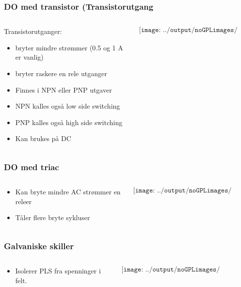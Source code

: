 \documentclass[aspectratio=169,xcolor=dvipsnames]{beamer}
\begin{document}
\begin{frame}
	\frametitle{DO med transistor (Transistorutgang}
	\begin{columns}
		\begin{column}{0.5\textwidth}
			Transistorutganger:
			\begin{itemize}
				\item bryter mindre strømmer (0.5 og 1 A er vanlig)
				\item bryter raskere en rele utganger
				\item Finnes i NPN eller PNP utgaver
				\item NPN kalles også low side switching
				\item PNP kalles også high side switching
				\item Kan brukes på DC
			\end{itemize}

			
		\end{column}

		\begin{column}{0.5\textwidth}
	$$\texttt{[image: ../output/noGPLimages/pls04.png]}$$
		\end{column}
	\end{columns}
\end{frame}

\begin{frame}
	\frametitle{DO med triac}
	\begin{columns}
		\begin{column}{0.5\textwidth}
			\begin{itemize}
				\item Kan bryte mindre AC strømmer en releer
				\item Tåler flere bryte sykluser
			\end{itemize}

			
		\end{column}

		\begin{column}{0.5\textwidth}
	$$\texttt{[image: ../output/noGPLimages/pls05.png]}$$
		\end{column}
	\end{columns}
\end{frame}

\begin{frame}
	\frametitle{Galvaniske skiller}
	\begin{columns}
		\begin{column}{0.5\textwidth}
			\begin{itemize}
				\item Isolerer PLS fra spenninger i felt. 
			\end{itemize}

			
		\end{column}

		\begin{column}{0.5\textwidth}
	$$\texttt{[image: ../output/noGPLimages/pls06.png]}$$
		\end{column}
	\end{columns}
\end{frame}
\end{document}
